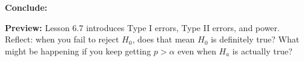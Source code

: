\documentclass[10pt]{article}
\begin{document}
\begin{enumerate}
        \textbf{Conclude:} 

\end{enumerate}

\begin{reflectionbox}
\textbf{Preview:} Lesson 6.7 introduces Type I errors, Type II errors, and power. Reflect:
when you fail to reject $H_0$, does that mean $H_0$ is definitely true? What might be
happening if you keep getting $p > \alpha$ even when $H_a$ is actually true?
\end{reflectionbox}
\end{document}
